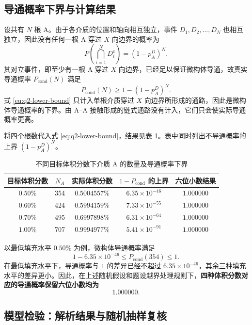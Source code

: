 \documentclass[withoutpreface,bwprint]{cumcmthesis}
\begin{document}
\subsection{导通概率下界与计算结果}

设共有 $N$ 根 A。由于各介质的位置和轴向相互独立，事件 $D_1,D_2,\ldots,D_N$ 也相互独立，因此没有任何一根 A 穿过 $X$ 向边界的概率为
\[
P\!\left(\bigcap_{i=1}^{N}D_i^{\mathrm c}\right)
=(1-p_A^D)^N.
\]
其对立事件，即至少有一根 A 穿过 $X$ 向边界，已经足以保证微构体导通，故真实导通概率 $P_{\mathrm{cond}}(N)$ 满足
\begin{equation}
 P_{\mathrm{cond}}(N)\geq 1-(1-p_A^{D})^N.
 \label{eq:q2-lower-bound}
\end{equation}
式 \eqref{eq:q2-lower-bound} 只计入单根介质穿过 $X$ 向边界所形成的通路，因此是微构体导通概率的下界。由 A--A 接触形成的链式通路没有计入，它们只会使实际导通概率更高。

将四个根数代入式 \eqref{eq:q2-lower-bound}，结果见表 \ref{tab:q2-results}。表中同时列出不导通概率的上界 $(1-p_A^D)^N$。

\begin{table}[H]
\centering
\caption{不同目标体积分数下介质 A 的数量及导通概率下界}
\label{tab:q2-results}
\begin{tabular}{ccccc}
\toprule
目标体积分数 & $N_A$ & 实际体积分数 & $1-P_{\mathrm{cond}}$ 的上界 & 六位小数结果 \\
\midrule
$0.50\%$ & 354 & $0.5004557\%$ & $6.35\times10^{-46}$ & $1.000000$ \\
$0.60\%$ & 424 & $0.5994159\%$ & $7.33\times10^{-55}$ & $1.000000$ \\
$0.70\%$ & 495 & $0.6997898\%$ & $6.31\times10^{-64}$ & $1.000000$ \\
$1.00\%$ & 707 & $0.9994977\%$ & $5.41\times10^{-91}$ & $1.000000$ \\
\bottomrule
\end{tabular}
\end{table}

以最低填充水平 $0.50\%$ 为例，微构体导通概率满足
\[
1-6.35\times10^{-46}\leq P_{\mathrm{cond}}(354)\leq1.
\]
在最低填充水平下，导通概率与 $1$ 的差异已经不超过 $6.35\times10^{-46}$，其余三种填充水平的差异更小。因此，在上述随机假设和题设越界处理规则下，\textbf{四种体积分数对应的导通概率保留六位小数均为}
\[
\boxed{1.000000}.
\]

\subsection{模型检验：解析结果与随机抽样复核}
\end{document}
